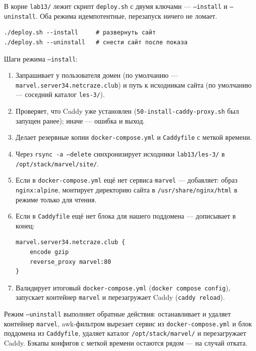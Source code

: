 В корне \texttt{lab13/} лежит скрипт \texttt{deploy.sh} с двумя
ключами --- \texttt{--install} и \texttt{--uninstall}. Оба режима
идемпотентные, перезапуск ничего не ломает.

\begin{lstlisting}[caption={Запуск деплоя и сноса сайта},captionpos=b]
./deploy.sh --install     # развернуть сайт
./deploy.sh --uninstall   # снести сайт после показа
\end{lstlisting}

Шаги режима \texttt{--install}:

\begin{enumerate}
  \item Запрашивает у пользователя домен (по умолчанию ---
        \texttt{marvel.server34.netcraze.club}) и путь к исходникам
        сайта (по умолчанию --- соседний каталог
        \texttt{les-3/}).
  \item Проверяет, что Caddy уже установлен
        (\texttt{50-install-caddy-proxy.sh} был запущен ранее);
        иначе --- ошибка и выход.
  \item Делает резервные копии \texttt{docker-compose.yml} и
        \texttt{Caddyfile} с меткой времени.
  \item Через \texttt{rsync -a --delete} синхронизирует исходники
        \texttt{lab13/les-3/} в \texttt{/opt/stack/marvel/site/}.
  \item Если в \texttt{docker-compose.yml} ещё нет сервиса
        \texttt{marvel} --- добавляет: образ \texttt{nginx:alpine},
        монтирует директорию сайта в \texttt{/usr/share/nginx/html}
        в режиме только для чтения.
  \item Если в \texttt{Caddyfile} ещё нет блока для нашего поддомена
        --- дописывает в конец:
        \begin{lstlisting}
marvel.server34.netcraze.club {
    encode gzip
    reverse_proxy marvel:80
}
        \end{lstlisting}
  \item Валидирует итоговый \texttt{docker-compose.yml}
        (\texttt{docker compose config}), запускает контейнер
        \texttt{marvel} и перезагружает Caddy
        (\texttt{caddy reload}).
\end{enumerate}

Режим \texttt{--uninstall} выполняет обратные действия: останавливает
и удаляет контейнер \texttt{marvel}, awk-фильтром вырезает сервис из
\texttt{docker-compose.yml} и блок поддомена из \texttt{Caddyfile},
удаляет каталог \texttt{/opt/stack/marvel/} и перезагружает Caddy.
Бэкапы конфигов с меткой времени остаются рядом --- на случай отката.

